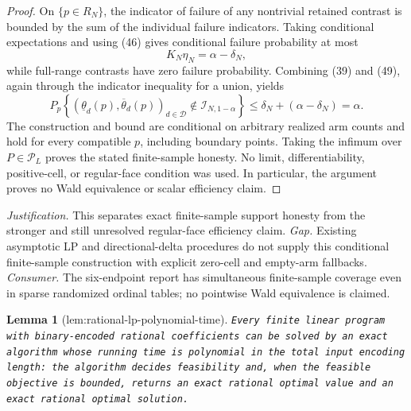 \documentclass{article}
\newtheorem{lemma}{Lemma}
\begin{document}
\begin{proof}
On \(\{p\in R_N\}\), the indicator of failure of any nontrivial retained contrast is bounded by the sum of the individual failure indicators.  Taking conditional expectations and using (46) gives conditional failure probability at most
\[
 K_N\eta_N=\alpha-\delta_N,                                                 \tag{49}
\]
while full-range contrasts have zero failure probability.  Combining (39) and (49), again through the indicator inequality for a union, yields
\[
 P_p\left\{(\underline\theta_d(p),\overline\theta_d(p))_{d\in\mathcal D}
 \notin\mathcal I_{N,1-\alpha}\right\}
 \leq\delta_N+(\alpha-\delta_N)=\alpha.                                   \tag{50}
\]
The construction and bound are conditional on arbitrary realized arm counts and hold for every compatible \(p\), including boundary points.  Taking the infimum over \(P\in\mathcal P_L\) proves the stated finite-sample honesty.  No limit, differentiability, positive-cell, or regular-face condition was used.  In particular, the argument proves no Wald equivalence or scalar efficiency claim.
\end{proof}
\par\smallskip\noindent \textit{Justification.} This separates exact finite-sample support honesty from the stronger and still unresolved regular-face efficiency claim. \textit{Gap.} Existing asymptotic LP and directional-delta procedures do not supply this conditional finite-sample construction with explicit zero-cell and empty-arm fallbacks. \textit{Consumer.} The six-endpoint report has simultaneous finite-sample coverage even in sparse randomized ordinal tables; no pointwise Wald equivalence is claimed.

\begin{lemma}[lem:rational-lp-polynomial-time]\label{lem:rational-lp-polynomial-time}
\texttt{Every finite linear program with binary-\allowbreak{}encoded rational coefficients can be solved by an exact algorithm whose running time is polynomial in the total input encoding length:\allowbreak{} the algorithm decides feasibility and,\allowbreak{} when the feasible objective is bounded,\allowbreak{} returns an exact rational optimal value and an exact rational optimal solution.}
\end{lemma}
\end{document}
